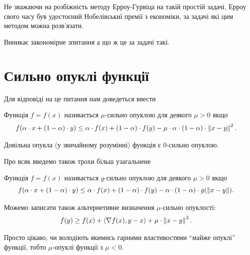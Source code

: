 \begin{remark}
    Не зважаючи на розбіжність методу Ерроу-Гурвіца на такій простій задачі, Ерроу свого часу був удостоєний Нобелівськиї премії з економіки, за задачі які цим методом можна розв'язати.
\end{remark}

Виникає закономірне зпитання а що ж це за задачі такі. 

\section{Сильно опуклі функції}

Для відповіді на це питання нам доведеться ввести 

\begin{definition}
    Функція $f = f(x)$ називається $\mu$-сильно опуклою для деякого $\mu > 0$ якщо
    \begin{equation}
        f(\alpha \cdot x + (1 - \alpha) \cdot y) \le \alpha \cdot f(x) + (1 - \alpha) \cdot f(y) - \mu \cdot \alpha \cdot (1 - \alpha) \cdot \left\| x - y \right\|^2.
    \end{equation}
\end{definition}

\begin{example}
    Довільна опукла (у звичайному розумінні) функція є $0$-сильно опуклою.
\end{example}

Про всяк введемо також трохи більш узагальнене

\begin{definition}
    Функція $f = f(x)$ називається $g$-сильно опуклою для деякого $\mu > 0$ якщо
    \begin{equation}
        f(\alpha \cdot x + (1 - \alpha) \cdot y) \le \alpha \cdot f(x) + (1 - \alpha) \cdot f(y) - \alpha \cdot (1 - \alpha) \cdot g(\left\| x - y \right\|).
    \end{equation}
\end{definition}

Можемо записати також альтернетивне визначення
$\mu$-сильно опуклості:
\begin{equation}
    f(y) \ge f(x) + \left\langle \nabla f(x), y - x \right\rangle + \mu \cdot \left\| x - y \right\|^2.
\end{equation}

\begin{remark}
    Просто цікаво, чи володіють якимись гарними властивостями ``майже опуклі'' функції, тобто $\mu$-опуклі функції з $\mu < 0$.
\end{remark}

